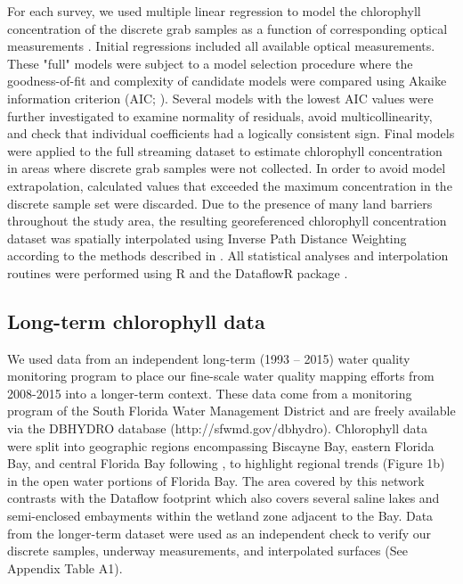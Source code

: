 For each survey, we used multiple linear regression to model the chlorophyll concentration of the discrete grab samples as a function of corresponding optical measurements \citep{seppala_ship_opportunity_2007,seppala_multivariate_2008}. Initial regressions included all available optical measurements. These "full" models were subject to a model selection procedure where the goodness-of-fit and complexity of candidate models were compared using Akaike information criterion (AIC; \citep{venables2002modern}). Several models with the lowest AIC values were further investigated to examine normality of residuals, avoid multicollinearity, and check that individual coefficients had a logically consistent sign. Final models were applied to the full streaming dataset to estimate chlorophyll concentration in areas where discrete grab samples were not collected. In order to avoid model extrapolation, calculated values that exceeded the maximum concentration in the discrete sample set were discarded. Due to the presence of many land barriers throughout the study area, the resulting georeferenced chlorophyll concentration dataset was spatially interpolated using Inverse Path Distance Weighting according to the methods described in \citep{stachelek_application_2015}. All statistical analyses and interpolation routines were performed using R \citep{rcore_2015} and the DataflowR package \citep{dataflowr}.

\subsection{Long-term chlorophyll data}
\label{longtermchl}

We used data from an independent long-term (1993 – 2015) water quality monitoring program to place our fine-scale water quality mapping efforts from 2008-2015 into a longer-term context. These data come from a monitoring program of the South Florida Water Management District and are freely available via the DBHYDRO database (http://sfwmd.gov/dbhydro). Chlorophyll data were split into geographic regions encompassing Biscayne Bay, eastern Florida Bay, and central Florida Bay following \citet{boyer_seasonal_1999}, to highlight regional trends (Figure 1b) in the open water portions of Florida Bay. The area covered by this network contrasts with the Dataflow footprint which also covers several saline lakes and semi-enclosed embayments within the wetland zone adjacent to the Bay. Data from the longer-term dataset were used as an independent check to verify our discrete samples, underway measurements, and interpolated surfaces (See Appendix Table A1).

